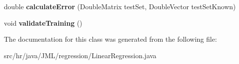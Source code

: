 \begin{DoxyCompactItemize}
\item 
\hypertarget{classhr_1_1java_1_1_j_m_l_1_1regression_1_1_linear_regression_ad35d73add6c9c2e2c7c9e871ed5a391d}{double {\bfseries calculate\+Error} (Double\+Matrix test\+Set, Double\+Vector test\+Set\+Known)}\label{classhr_1_1java_1_1_j_m_l_1_1regression_1_1_linear_regression_ad35d73add6c9c2e2c7c9e871ed5a391d}

\item 
\hypertarget{classhr_1_1java_1_1_j_m_l_1_1regression_1_1_linear_regression_a64031e5cefc57c223b6db2ee49c29698}{void {\bfseries validate\+Training} ()}\label{classhr_1_1java_1_1_j_m_l_1_1regression_1_1_linear_regression_a64031e5cefc57c223b6db2ee49c29698}

\end{DoxyCompactItemize}


The documentation for this class was generated from the following file\+:\begin{DoxyCompactItemize}
\item 
src/hr/java/\+J\+M\+L/regression/Linear\+Regression.\+java\end{DoxyCompactItemize}
